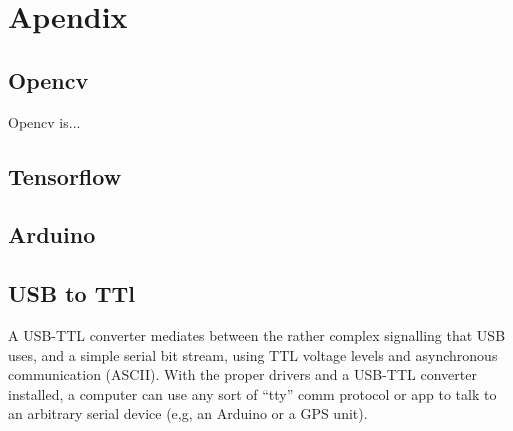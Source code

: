 
\chapter{Apendix}
\appendix
\section{Opencv}\label{appendix:opencv}
Opencv is...

\section{Tensorflow}\label{appendix:tensorflow}


\section{Arduino}\label{appendix:Arduino}

\section{USB to TTl}\label{appendix:USBTOTTL}
A USB-TTL converter mediates between the rather complex signalling that USB uses, and a simple serial bit stream, using TTL voltage levels and asynchronous communication (ASCII). With the proper drivers and a USB-TTL converter installed, a computer can use any sort of “tty” comm protocol or app to talk to an arbitrary serial device (e,g, an Arduino or a GPS unit). %


